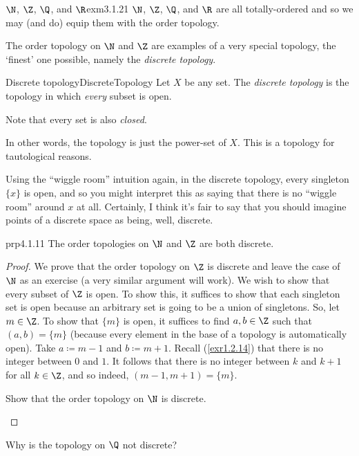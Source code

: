 \begin{exm}{$\N$, $\Z$, $\Q$, and $\R$}{exm3.1.21}
$\N$, $\Z$, $\Q$, and $\R$ are all totally-ordered and so we may (and do) equip them with the order topology.
\end{exm}
The order topology on $\N$ and $\Z$ are examples of a very special topology, the `finest' one possible, namely the \emph{discrete topology}.
\begin{dfn}{Discrete topology}{DiscreteTopology}
Let $X$ be any set.  The \emph{discrete topology} is the topology in which \emph{every} subset is open.
\begin{rmk}
Note that every set is also \emph{closed}.
\end{rmk}
\begin{rmk}
In other words, the topology is just the power-set of $X$.  This is a topology for tautological reasons.
\end{rmk}
\begin{rmk}
Using the ``wiggle room'' intuition again, in the discrete topology, every singleton $\{ x\}$ is open, and so you might interpret this as saying that there is no ``wiggle room'' around $x$ at all.  Certainly, I think it's fair to say that you should imagine points of a discrete space as being, well, discrete.
\end{rmk}
\end{dfn}
\begin{prp}{}{prp4.1.11}
The order topologies on $\N$ and $\Z$ are both discrete.
\begin{proof}
We prove that the order topology on $\Z$ is discrete and leave the case of $\N$ as an exercise (a very similar argument will work).  We wish to show that every subset of $\Z$ is open.  To show this, it suffices to show that each singleton set is open because an arbitrary set is going to be a union of singletons.  So, let $m\in \Z$.  To show that $\{ m\}$ is open, it suffices to find $a,b\in \Z$ such that $(a,b)=\{ m\}$ (because every element in the base of a topology is automatically open).  Take $a\coloneqq m-1$ and $b\coloneqq m+1$.  Recall (\cref{exr1.2.14}) that there is no integer between $0$ and $1$.  It follows that there is no integer between $k$ and $k+1$ for all $k\in \Z$, and so indeed, $(m-1,m+1)=\{ m\}$.
\begin{exr}{}{}
Show that the order topology on $\N$ is discrete.
\end{exr}
\end{proof}
\end{prp}
\begin{exr}{}{}
Why is the topology on $\Q$ not discrete?
\end{exr}
